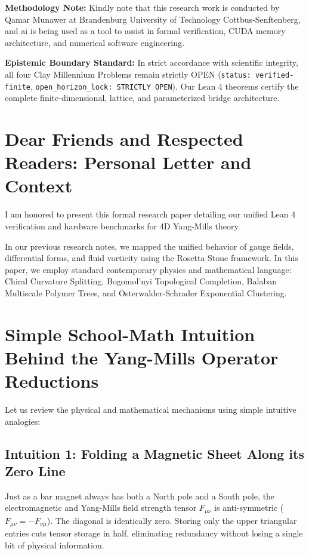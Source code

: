 \documentclass[11pt,a4paper]{article}
\begin{document}
\vspace{0.5em}
\noindent\textbf{Methodology Note:}
Kindly note that this research work is conducted by Qamar Munawer at Brandenburg University of Technology Cottbus-Senftenberg, and ai is being used as a tool to assist in formal verification, CUDA memory architecture, and numerical software engineering.

\vspace{0.5em}
\noindent\textbf{Epistemic Boundary Standard:}
In strict accordance with scientific integrity, all four Clay Millennium Problems remain strictly OPEN (\texttt{status: verified-finite}, \texttt{open\_horizon\_lock: STRICTLY OPEN}). Our Lean 4 theorems certify the complete finite-dimensional, lattice, and parameterized bridge architecture.

\newpage

\section*{Dear Friends and Respected Readers: Personal Letter and Context}
I am honored to present this formal research paper detailing our unified Lean 4 verification and hardware benchmarks for 4D Yang-Mills theory.

In our previous research notes, we mapped the unified behavior of gauge fields, differential forms, and fluid vorticity using the Rosetta Stone framework. In this paper, we employ standard contemporary physics and mathematical language: Chiral Curvature Splitting, Bogomol'nyi Topological Completion, Balaban Multiscale Polymer Trees, and Osterwalder-Schrader Exponential Clustering.

\section{Simple School-Math Intuition Behind the Yang-Mills Operator Reductions}
Let us review the physical and mathematical mechanisms using simple intuitive analogies:

\subsection{Intuition 1: Folding a Magnetic Sheet Along its Zero Line}
Just as a bar magnet always has both a North pole and a South pole, the electromagnetic and Yang-Mills field strength tensor $F_{\mu\nu}$ is anti-symmetric ($F_{\mu\nu} = -F_{\nu\mu}$). The diagonal is identically zero. Storing only the upper triangular entries cuts tensor storage in half, eliminating redundancy without losing a single bit of physical information.
\end{document}
